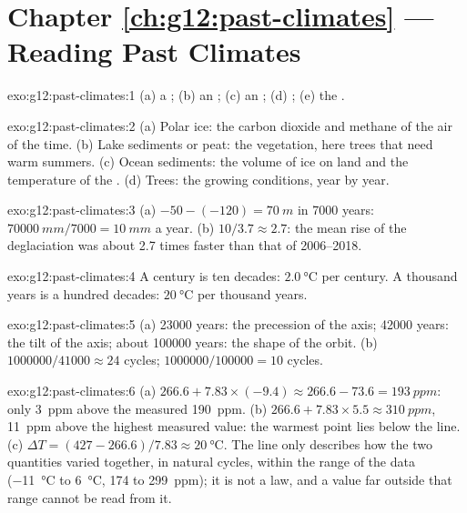\section*{Chapter \ref{ch:g12:past-climates} --- Reading Past Climates}

\begin{solution}{exo:g12:past-climates:1}
(a) a ; (b) an ; (c) an ; (d) ;
(e) the .
\end{solution}

\begin{solution}{exo:g12:past-climates:2}
(a) Polar ice: the carbon dioxide and methane of the air of the time.
(b) Lake sediments or peat: the vegetation, here trees that need warm
summers. (c) Ocean sediments: the volume of ice on land and the temperature
of the . (d) Trees: the growing conditions, year by year.
\end{solution}

\begin{solution}{exo:g12:past-climates:3}
(a) $-50 - (-120) = \qty{70}{m}$ in \num{7000} years: $\qty{70000}{mm}/\num{7000}
= \qty{10}{mm}$ a year. (b) $10/3.7 \approx 2.7$: the mean rise of the
deglaciation was about 2.7 times faster than that of 2006--2018.
\end{solution}

\begin{solution}{exo:g12:past-climates:4}
A century is ten decades: $\qty{2.0}{\degreeCelsius}$ per century. A thousand
years is a hundred decades: $\qty{20}{\degreeCelsius}$ per thousand years.
\end{solution}

\begin{solution}{exo:g12:past-climates:5}
(a) \num{23000} years: the precession of the axis; \num{42000} years: the
tilt of the axis; about \num{100000} years: the shape of the orbit.
(b) $\num{1000000}/\num{41000} \approx 24$ cycles; $\num{1000000}/\num{100000}
= 10$ cycles.
\end{solution}

\begin{solution}{exo:g12:past-climates:6}
(a) $266.6 + 7.83 \times (-9.4) \approx 266.6 - 73.6 = \qty{193}{ppm}$: only
\qty{3}{ppm} above the measured \qty{190}{ppm}. (b) $266.6 + 7.83 \times 5.5
\approx \qty{310}{ppm}$, \qty{11}{ppm} above the highest measured value: the
warmest point lies below the line. (c) $\Delta T = (427 - 266.6)/7.83 \approx
\qty{20}{\degreeCelsius}$. The line only describes how the two quantities
varied together, in natural cycles, within the range of the data
(\qty{-11}{\degreeCelsius} to \qty{+6}{\degreeCelsius}, 174 to
\qty{299}{ppm}); it is not a law, and a value far outside that range cannot
be read from it.
\end{solution}

